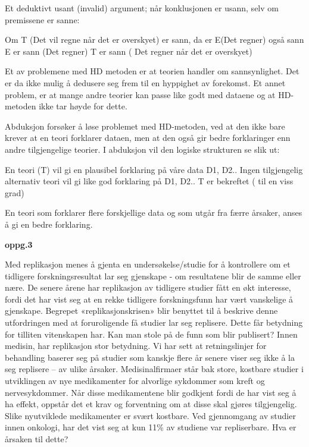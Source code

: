 \documentclass[
  letterpaper,
  DIV=11,
  numbers=noendperiod]{scrreprt}
\begin{document}
Et deduktivt usant (invalid) argument; når konklusjonen er usann, selv
om premissene er sanne:

Om T (Det vil regne når det er overskyet) er sann, da er E(Det regner)
også sann E er sann (Det regner) T er sann ( Det regner når det er
overskyet)

Et av problemene med HD metoden er at teorien handler om sannsynlighet.
Det er da ikke mulig å dedusere seg frem til en hyppighet av forekomst.
Et annet problem, er at mange andre teorier kan passe like godt med
dataene og at HD-metoden ikke tar høyde for dette.

Abduksjon forsøker å løse problemet med HD-metoden, ved at den ikke bare
krever at en teori forklarer dataen, men at den også gir bedre
forklaringer enn andre tilgjengelige teorier. I abduksjon vil den
logiske strukturen se slik ut:

En teori (T) vil gi en plausibel forklaring på våre data D1, D2.. Ingen
tilgjengelig alternativ teori vil gi like god forklaring på D1, D2.. T
er bekreftet ( til en viss grad)

En teori som forklarer flere forskjellige data og som utgår fra færre
årsaker, anses å gi en bedre forklaring.

\textbf{oppg.3}

Med replikasjon menes å gjenta en undersøkelse/studie for å kontrollere
om et tidligere forskningsresultat lar seg gjenskape - om resultatene
blir de samme eller nære. De senere årene har replikasjon av tidligere
studier fått en økt interesse, fordi det har vist seg at en rekke
tidligere forskningsfunn har vært vanskelige å gjenskape. Begrepet
«replikasjonskrisen» blir benyttet til å beskrive denne utfordringen med
at foruroligende få studier lar seg replisere. Dette får betydning for
tilliten vitenskapen har. Kan man stole på de funn som blir publisert?
Innen medisin, har replikasjon stor betydning. Vi har sett at
retningslinjer for behandling baserer seg på studier som kanskje flere
år senere viser seg ikke å la seg replisere -- av ulike årsaker.
Medisinalfirmaer står bak store, kostbare studier i utviklingen av nye
medikamenter for alvorlige sykdommer som kreft og nervesykdommer. Når
disse medikamentene blir godkjent fordi de har vist seg å ha effekt,
oppstår det et krav og forventning om at disse skal gjøres tilgjengelig.
Slike nyutviklede medikamenter er svært kostbare. Ved gjennomgang av
studier innen onkologi, har det vist seg at kun 11\% av studiene var
repliserbare. Hva er årsaken til dette?
\end{document}
